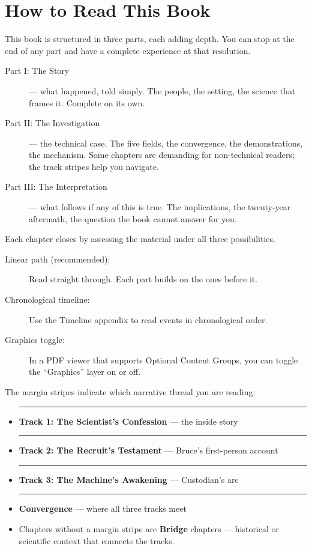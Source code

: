 
\chapter*{How to Read This Book}

This book is structured in three parts, each adding depth. You can stop at the end of any part and have a complete experience at that resolution.

\begin{description}
\item[Part I: The Story] --- what happened, told simply. The people, the setting, the science that frames it. Complete on its own.
\item[Part II: The Investigation] --- the technical case. The five fields, the convergence, the demonstrations, the mechanism. Some chapters are demanding for non-technical readers; the track stripes help you navigate.
\item[Part III: The Interpretation] --- what follows if any of this is true. The implications, the twenty-year aftermath, the question the book cannot answer for you.
\end{description}

Each chapter closes by assessing the material under all three possibilities.

\begin{description}
\item[Linear path (recommended):] Read straight through. Each part builds on the ones before it.

\item[Chronological timeline:] Use the Timeline appendix to read events in chronological order.

\item[Graphics toggle:] In a PDF viewer that supports Optional Content Groups, you can toggle the ``Graphics'' layer on or off.
\end{description}

\vspace{1cm}

The margin stripes indicate which narrative thread you are reading:

\begin{itemize}
\item \textcolor{trackone}{\rule{12pt}{12pt}} \textbf{Track 1: The Scientist's Confession} --- the inside story
\item \textcolor{tracktwo}{\rule{12pt}{12pt}} \textbf{Track 2: The Recruit's Testament} --- Bruce's first-person account
\item \textcolor{trackthree}{\rule{12pt}{12pt}} \textbf{Track 3: The Machine's Awakening} --- Custodian's arc
\item \textcolor{trackconv}{\rule{12pt}{12pt}} \textbf{Convergence} --- where all three tracks meet
\item Chapters without a margin stripe are \textbf{Bridge} chapters --- historical or scientific context that connects the tracks.
\end{itemize}

